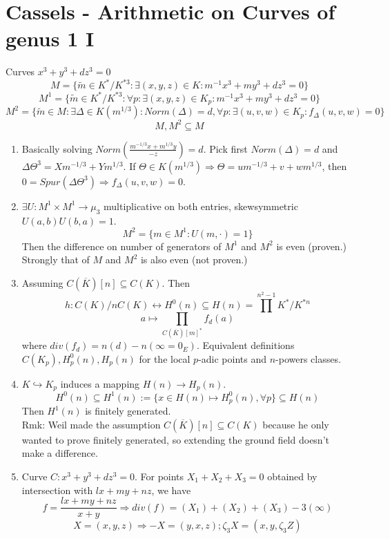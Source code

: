 \documentclass{article}
\newcommand{\ra}{\rightarrow}
\newcommand{\Ra}{\Rightarrow}
\newcommand{\lra}{\leftrightarrow}
\newcommand{\hra}{\hookrightarrow}
\newcommand{\ACK}{\overline{K}}
\begin{document}
\section{Cassels - Arithmetic on Curves of genus 1 I}
\begin{multicols}{2}
Curves $x^3 + y^3 + dz^3 = 0$
\[M = \{\tilde{m} \in K^*/K^{*3}: \exists (x,y,z) \in K: m^{-1}x^3 + my^3 + dz^3 = 0\}\]
\[M^1 = \{\tilde{m} \in K^*/K^{*3}: \forall p: \exists (x,y,z) \in K_p: m^{-1}x^3 + my^3 + dz^3 = 0\}\]
\[M^2 = \{\tilde{m} \in M: \exists \Delta \in K(m^{1/3}): Norm(\Delta) = d, \forall p: \exists (u,v,w) \in K_p: f_\Delta(u,v,w) = 0\}\]
\[M,M^2 \subseteq M\]
\begin{enumerate}

\item Basically solving $Norm(\frac{m^{-1/3}x + m^{1/3}y}{-z}) = d$. Pick first $Norm(\Delta) = d$ and $\Delta \Theta^3 = Xm^{-1/3}+Ym^{1/3}$. If $\Theta \in K(m^{1/3}) \Ra \Theta = um^{-1/3} + v + wm^{1/3}$, then $0 = Spur(\Delta\Theta^3) \Ra f_\Delta(u,v,w) = 0$.

\item $\exists U: M^1 \times M^1 \ra \mu_3$ multiplicative on both entries, skewsymmetric $U(a,b)U(b,a) = 1$.
\[M^2 = \{m \in M^1: U(m,\cdot) = 1\}\]
Then the difference on number of generators of $M^1$ and $M^2$ is even (proven.) Strongly that of $M$ and $M^2$ is also even (not proven.)

\item Assuming $C(\ACK)[n] \subseteq C(K)$. Then
\[h: C(K)/nC(K) \lra H^0(n) \subseteq H(n) = \prod^{n^2-1} K^*/K^{*n}\]
\[a \mapsto \prod_{C(\ACK)[m]^*} f_d(a)\]
where $div(f_d) = n(d) - n(\infty = 0_E)$. 
Equivalent definitions $C(K_p), H_p^0(n), H_p(n)$ for the local $p$-adic points and $n$-powers classes. 

\item $K \hra K_p$ induces a mapping $H(n) \ra H_p(n)$.
\[H^0(n) \subseteq H^1(n):=\{x \in H(n) \mapsto H_p^0(n), \forall p\} \subseteq H(n)\]
Then $H^1(n)$ is finitely generated. \\

Rmk: Weil made the assumption $C(\ACK)[n] \subseteq C(K)$ because he only wanted to prove finitely generated, so extending the ground field doesn't make a difference. 

\item Curve $C: x^3 + y^3 + dz^3 = 0$. For points $X_1 + X_2 + X_3 = 0$ obtained by intersection with $lx + my + nz$, we have 
\[f = \frac{lx + my + nz}{x + y} \Ra div(f) = (X_1) + (X_2) + (X_3) - 3(\infty)\]
\[X = (x,y,z) \Ra -X = (y,x,z); \zeta_3 X = (x,y, \zeta_3 Z)\]


\end{enumerate}
\end{multicols}
\end{document}

